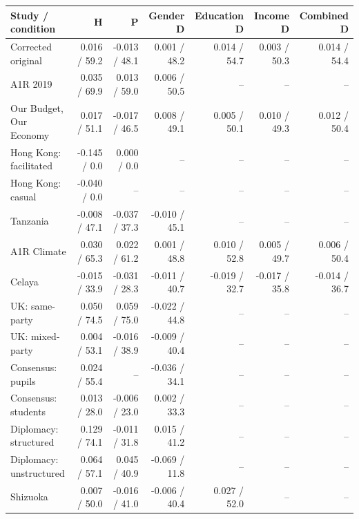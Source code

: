 
\begin{tabular}{lrrrrrr}
\toprule
Study / condition & H & P & Gender D & Education D & Income D & Combined D\\
\midrule
Corrected original & 0.016 / 59.2 & -0.013 / 48.1 & 0.001 / 48.2 & 0.014 / 54.7 & 0.003 / 50.3 & 0.014 / 54.4\\
A1R 2019 & 0.035 / 69.9 & 0.013 / 59.0 & 0.006 / 50.5 & -- & -- & --\\
Our Budget, Our Economy & 0.017 / 51.1 & -0.017 / 46.5 & 0.008 / 49.1 & 0.005 / 50.1 & 0.010 / 49.3 & 0.012 / 50.4\\
Hong Kong: facilitated & -0.145 / 0.0 & 0.000 / 0.0 & -- & -- & -- & --\\
Hong Kong: casual & -0.040 / 0.0 & -- & -- & -- & -- & --\\
\addlinespace
Tanzania & -0.008 / 47.1 & -0.037 / 37.3 & -0.010 / 45.1 & -- & -- & --\\
A1R Climate & 0.030 / 65.3 & 0.022 / 61.2 & 0.001 / 48.8 & 0.010 / 52.8 & 0.005 / 49.7 & 0.006 / 50.4\\
Celaya & -0.015 / 33.9 & -0.031 / 28.3 & -0.011 / 40.7 & -0.019 / 32.7 & -0.017 / 35.8 & -0.014 / 36.7\\
UK: same-party & 0.050 / 74.5 & 0.059 / 75.0 & -0.022 / 44.8 & -- & -- & --\\
UK: mixed-party & 0.004 / 53.1 & -0.016 / 38.9 & -0.009 / 40.4 & -- & -- & --\\
\addlinespace
Consensus: pupils & 0.024 / 55.4 & -- & -0.036 / 34.1 & -- & -- & --\\
Consensus: students & 0.013 / 28.0 & -0.006 / 23.0 & 0.002 / 33.3 & -- & -- & --\\
Diplomacy: structured & 0.129 / 74.1 & -0.011 / 31.8 & 0.015 / 41.2 & -- & -- & --\\
Diplomacy: unstructured & 0.064 / 57.1 & 0.045 / 40.9 & -0.069 / 11.8 & -- & -- & --\\
Shizuoka & 0.007 / 50.0 & -0.016 / 41.0 & -0.006 / 40.4 & 0.027 / 52.0 & -- & --\\
\bottomrule
\end{tabular}
